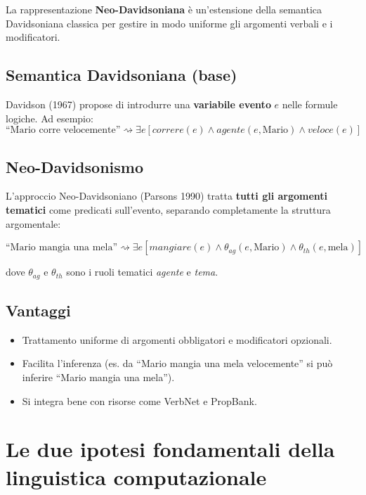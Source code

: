 \documentclass[12pt,a4paper]{article}
\begin{document}
La rappresentazione \textbf{Neo-Davidsoniana} è un'estensione della semantica Davidsoniana classica per gestire in modo uniforme gli argomenti verbali e i modificatori.

\subsection{Semantica Davidsoniana (base)}
Davidson (1967) propose di introdurre una \textbf{variabile evento} $e$ nelle formule logiche. Ad esempio:
\[
\text{``Mario corre velocemente''} \rightsquigarrow \exists e[\mathit{correre}(e) \wedge \mathit{agente}(e, \text{Mario}) \wedge \mathit{veloce}(e)]
\]

\subsection{Neo-Davidsonismo}
L'approccio Neo-Davidsoniano (Parsons 1990) tratta \textbf{tutti gli argomenti tematici} come predicati sull'evento, separando completamente la struttura argomentale:
\begin{defbox}
\[
\text{``Mario mangia una mela''} \rightsquigarrow \exists e[\mathit{mangiare}(e) \wedge \theta_{\mathit{ag}}(e, \text{Mario}) \wedge \theta_{\mathit{th}}(e, \text{mela})]
\]
\end{defbox}
dove $\theta_{\mathit{ag}}$ e $\theta_{\mathit{th}}$ sono i ruoli tematici \emph{agente} e \emph{tema}.

\subsection{Vantaggi}
\begin{itemize}[leftmargin=1.5em]
  \item Trattamento uniforme di argomenti obbligatori e modificatori opzionali.
  \item Facilita l'inferenza (es. da ``Mario mangia una mela velocemente'' si può inferire ``Mario mangia una mela'').
  \item Si integra bene con risorse come VerbNet e PropBank.
\end{itemize}

\section{Le due ipotesi fondamentali della linguistica computazionale}
\end{document}
